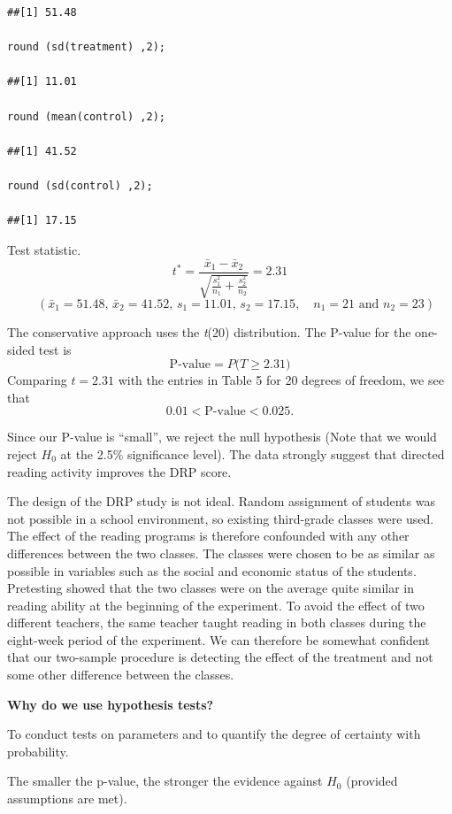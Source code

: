 \begin{example}
\begin{tcolorbox}[colback=gray!10, colframe=black!45, arc=2mm, before skip=4pt, after skip=4pt]
\begin{verbatim}
##[1] 51.48

round (sd(treatment) ,2);

##[1] 11.01

round (mean(control) ,2);

##[1] 41.52

round (sd(control) ,2);

##[1] 17.15
\end{verbatim}
\end{tcolorbox}
Test statistic. \\
\[
t^* = \frac{\bar{x}_1 - \bar{x}_2}{\sqrt{\frac{s_1^2}{n_1} + \frac{s_2^2}{n_2}}} = 2.31
\]
\[
\quad
(\bar{x}_1 = 51.48, \, \bar{x}_2 = 41.52, \, s_1 = 11.01, \, s_2 = 17.15,
\quad n_1 = 21 \text{ and } n_2 = 23)
\]

\vspace{1em}

The conservative approach uses the \textit{t}(20) distribution. The P-value for the one-sided test is
\[
\text{P-value} = P\bigl(T \geq 2.31 \bigr)
\]
Comparing $t = 2.31$ with the entries in Table 5 for 20 degrees of freedom, we see that
\[
0.01 < \text{P-value} < 0.025.
\]

\vspace{1em}

Since our P-value is ``small'', we reject the null hypothesis (Note that we would reject $H_0$ at the 2.5\% significance level). The data strongly suggest that directed reading activity improves the DRP score.

\vspace{1em}

The design of the DRP study is not ideal. Random assignment of students was not possible in a school environment, so existing third-grade classes were used. The effect of the reading programs is therefore confounded with any other differences between the two classes. The classes were chosen to be as similar as possible in variables such as the social and economic status of the students. Pretesting showed that the two classes were on the average quite similar in reading ability at the beginning of the experiment. To avoid the effect of two different teachers, the same teacher taught reading in both classes during the eight-week period of the experiment. We can therefore be somewhat confident that our two-sample procedure is detecting the effect of the treatment and not some other difference between the classes.

\end{example}
\begin{nt}
\textbf{Why do we use hypothesis tests?}

To conduct tests on parameters and to quantify the degree of certainty with probability.

The smaller the p-value, the stronger the evidence against $H_0$ (provided assumptions are met).

\end{nt}

